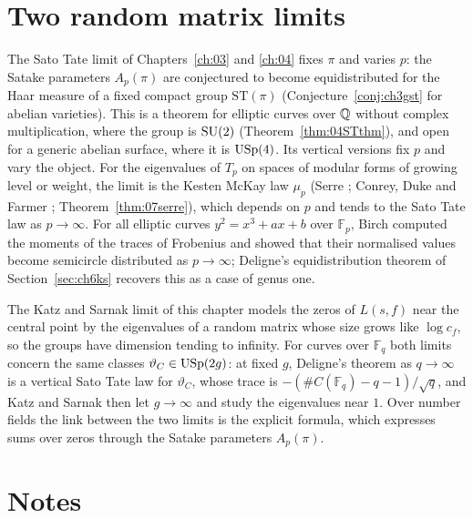 \section{Two random matrix limits}\label{sec:ch6two}

The Sato Tate limit of Chapters~\ref{ch:03} and \ref{ch:04} fixes $\pi$ and varies $p$: the Satake parameters $A_p(\pi)$ are conjectured to become equidistributed for the Haar measure of a fixed compact group $\mathrm{ST}(\pi)$ (Conjecture~\ref{conj:ch3gst} for abelian varieties). This is a theorem for elliptic curves over $\mathbb{Q}$ without complex multiplication, where the group is $\mathrm{SU}(2)$ (Theorem~\ref{thm:04STthm}), and open for a generic abelian surface, where it is $\mathrm{USp}(4)$. Its vertical versions fix $p$ and vary the object. For the eigenvalues of $T_p$ on spaces of modular forms of growing level or weight, the limit is the Kesten McKay law $\mu_p$ (Serre \cite{serre1997}; Conrey, Duke and Farmer \cite{cdf1997}; Theorem~\ref{thm:07serre}), which depends on $p$ and tends to the Sato Tate law as $p\to\infty$. For all elliptic curves $y^2=x^3+ax+b$ over $\mathbb{F}_p$, Birch \cite{birch1968} computed the moments of the traces of Frobenius and showed that their normalised values become semicircle distributed as $p\to\infty$; Deligne's equidistribution theorem of Section~\ref{sec:ch6ks} recovers this as a case of genus one.

The Katz and Sarnak limit of this chapter models the zeros of $L(s,f)$ near the central point by the eigenvalues of a random matrix whose size grows like $\log c_f$, so the groups have dimension tending to infinity. For curves over $\mathbb{F}_q$ both limits concern the same classes $\vartheta_C\in\mathrm{USp}(2g)$: at fixed $g$, Deligne's theorem as $q\to\infty$ is a vertical Sato Tate law for $\vartheta_C$, whose trace is $-(\#C(\mathbb{F}_q)-q-1)/\sqrt q$, and Katz and Sarnak then let $g\to\infty$ and study the eigenvalues near $1$. Over number fields the link between the two limits is the explicit formula, which expresses sums over zeros through the Satake parameters $A_p(\pi)$.

\section{Notes}

